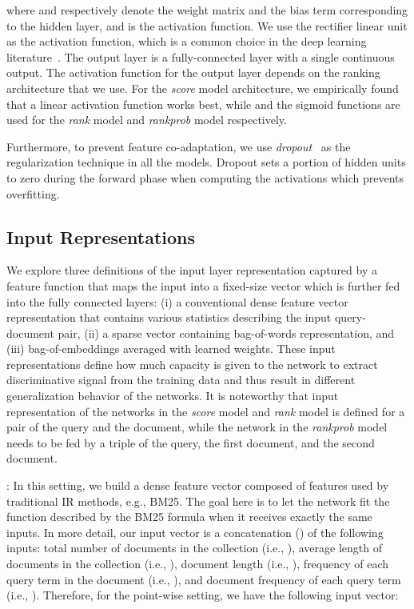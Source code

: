 \documentclass[sigconf]{acmart}
\newcommand{\modelone}{\textit{score} model\xspace}
\newcommand{\modeltwo}{\textit{rank} model\xspace}
\newcommand{\modelthree}{\textit{rank\-prob} model\xspace}
\newcommand{\Feedone}{Dense vector representation\xspace}
\newcommand{\fone}{Dense\xspace}
\newcommand{\sshrink}{\vspace{-.80ex}}
\begin{document}
where  and  respectively denote the weight matrix and the bias term corresponding to the  hidden layer, and  is the activation function. We use the rectifier linear unit  as the activation function, which is a common choice in the deep learning literature~\citep{Lecun:2015}. 
The output layer  is a fully-connected layer with a single continuous output. The activation function for the output layer depends on the ranking architecture that we use. For the \modelone architecture, we empirically found that a linear activation function works best, while  and the sigmoid functions are used for the \modeltwo and \modelthree respectively.

Furthermore, to prevent feature co-adaptation, we use \emph{dropout}~\citep{Srivastava:2014} as the regularization technique in all the models. Dropout sets a portion of hidden units to zero during the forward phase when computing the activations which prevents overfitting.



\sshrink
\subsection{Input Representations}
\label{sec:feedings}
We explore three definitions of the input layer representation  captured by a feature function  that maps the input into a fixed-size vector which is further fed into the fully connected layers: 
(i) a conventional dense feature vector representation that contains various statistics describing the input query-document pair, 
(ii) a sparse vector containing bag-of-words representation, and 
(iii) bag-of-embeddings averaged with learned weights. 
These input representations define how much capacity is given to the network to extract discriminative signal from the training data and thus result in different generalization behavior of the networks. 
It is noteworthy that input representation of the networks in the \modelone and \modeltwo is defined for a pair of the query and the document, while the network in the \modelthree needs to be fed by a triple of the query, the first document, and the second document.

\mypar{\Feedone (\fone)}: 
In this setting, we build a dense feature vector composed of features used by traditional IR methods, e.g., BM25. The goal here is to let the network fit the function described by the BM25 formula when it receives exactly the same inputs. 
In more detail, our input vector is a concatenation () of the following inputs: total number of documents in the collection (i.e., ), average length of documents in the collection (i.e., ), document length (i.e., ), frequency of each query term  in the document (i.e., ), and document frequency of each query term (i.e., ). Therefore, for the point-wise setting, we have the following input vector:
\end{document}
